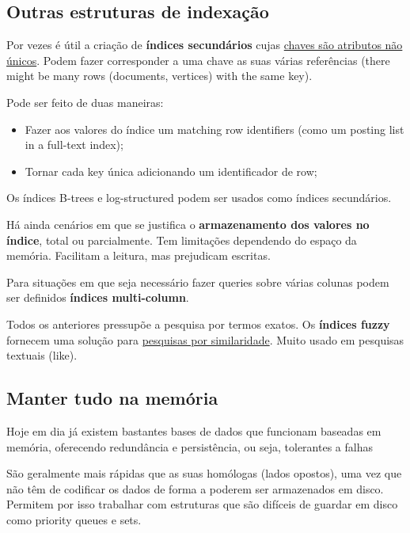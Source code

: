 \documentclass{article}
\begin{document}
\pagebreak

\subsection{Outras estruturas de indexação}

Por vezes é útil a criação de \textbf{índices secundários} cujas \uline{chaves são atributos não únicos}. Podem
fazer corresponder a uma chave as suas várias referências (there
might be many rows (documents, vertices) with the same
key).

Pode ser feito de duas maneiras:
\begin{itemize}
  \item Fazer aos valores do índice um matching row identifiers (como um posting list in a full-text index);
  \item Tornar cada key única adicionando um identificador de row;
\end{itemize}

Os índices B-trees e log-structured podem ser usados como índices secundários. 

\vspace{2mm}

Há ainda cenários em que se justifica o \textbf{armazenamento dos valores no índice}, total ou
parcialmente. Tem limitações dependendo do espaço da memória. Facilitam a leitura, mas
prejudicam escritas.

\vspace{2mm}

Para situações em que seja necessário fazer
queries sobre várias colunas podem ser definidos
\textbf{índices multi-column}.

\vspace{2mm}

Todos os anteriores pressupõe a pesquisa por termos exatos. Os \textbf{índices fuzzy} fornecem uma
solução para \uline{pesquisas por similaridade}. Muito usado em pesquisas textuais (like).

\subsection{Manter tudo na memória}

Hoje em dia já existem bastantes bases de dados que funcionam baseadas em memória,
oferecendo redundância e persistência, ou seja, tolerantes a falhas

\vspace{2mm}

São geralmente mais rápidas que as suas homólogas (lados opostos), uma vez que não têm de codificar os
dados de forma a poderem ser armazenados em disco. Permitem por isso trabalhar com
estruturas que são difíceis de guardar em disco como
priority queues e sets.
\end{document}

